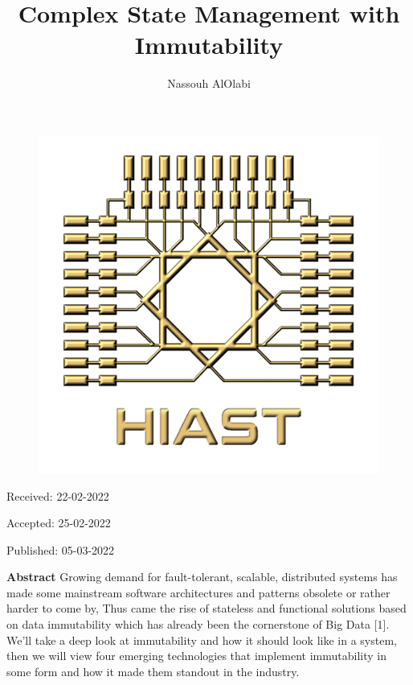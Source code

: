 \documentclass[12pt,twoside]{article}
\title{\Huge{Complex State Management with Immutability}}
\author{Nassouh AlOlabi}
\affil{Scientific supervisor: Dr.Yasser Rahal}
\affil{General supervisor: Dr.Kadan Joumaa}
\affil{Linguistic supervisor: Fahmi Al Ammareen}
\date{}
\makeatletter
\def\maketitle{{%
		\renewenvironment{tabular}[2][]
		{\begin{flushleft}}
			{\end{flushleft}}
		\AB@maketitle}}
\makeatother
\begin{document}

\begin{figure}
    {\includegraphics[scale=.25]{logo.png}}
\end{figure}

\maketitle

\thispagestyle{first}

\vspace{0.5cm}

\hfill Received: 22-02-2022 

\hfill Accepted: 25-02-2022

\hfill Published: 05-03-2022

\vspace{1cm}


\vspace{1.5cm}
\newpage
\noindent \textbf{Abstract}
\newline\newline
\noindent Growing demand for fault-tolerant, scalable, distributed systems has made some mainstream software architectures and patterns obsolete or rather harder to come by, Thus came the rise of stateless and functional solutions based on data immutability which has already been the cornerstone of Big Data [1]. We'll take a deep look at immutability and how it should look like in a system, then we will view four emerging technologies that implement immutability in some form and how it made them standout in the industry.
\end{document}
